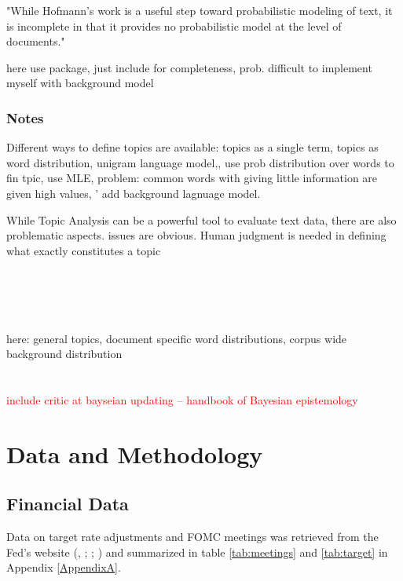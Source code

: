 \documentclass[11pt,a4paper,english,oneside]{book}
\numberwithin{equation}{chapter}
\begin{document}
"While Hofmann’s work is a useful step toward probabilistic modeling of text, it is incomplete in that it provides no probabilistic model at the level of documents." \cite[p. 994]{Blei.2003}


here use package, just include for completeness, prob. difficult to implement myself with background model




\subsection{Notes}


Different ways to define topics are available: topics as a single term, topics as word distribution,
unigram language model,, use prob distribution over words to fin tpic, use MLE, problem: common words with giving little information are given high values, ' add background lagnuage model.  

While Topic Analysis can be a powerful tool to evaluate text data, there are also problematic aspects. issues are obvious. Human judgment is needed in defining what exactly constitutes a topic

\cite{Hoffman2010} \\
\cite{Steyvers(2007)}\\
\cite{Blei.2003}\\
\cite{Asuncion.2009}\\
here:  general topics, document specific word distributions, corpus wide background distribution \cite{Chem.2007}\\
\cite{Bishop.2006}\\
\cite{Darling.2011}\\

\textcolor{red}{include critic at bayseian updating -- handbook of Bayesian epistemology}


\chapter{Data and Methodology}


\section{Financial Data}\label{Ch:financedata}

Data on target rate adjustments and FOMC meetings was retrieved from the Fed's website (\citealp{FRS.2018}, \citeyear{FRS.2013}; \citealp{FOMC.2018Archive}; \citeyear{FOMC.2018}) and summarized in table \ref{tab:meetings} and \ref{tab:target} in Appendix \ref{AppendixA}. 
\end{document}
